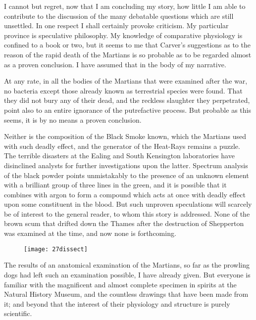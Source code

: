 

\lettrine[lines=4,findent=2pt]{I}{} cannot but regret, now that I am concluding my story, how little I am able to contribute to the discussion of the many debatable questions which are still unsettled. In one respect I shall certainly provoke criticism. My particular province is speculative philosophy. My knowledge of comparative physiology is confined to a book or two, but it seems to me that Carver's suggestions as to the reason of the rapid death of the Martians is so probable as to be regarded almost as a proven conclusion. I have assumed that in the body of my narrative.

At any rate, in all the bodies of the Martians that were examined after the war, no bacteria except those already known as terrestrial species were found. That they did not bury any of their dead, and the reckless slaughter they perpetrated, point also to an entire ignorance of the putrefactive process. But probable as this seems, it is by no means a proven conclusion.

Neither is the composition of the Black Smoke known, which the Martians used with such deadly effect, and the generator of the Heat-Rays remains a puzzle. The terrible disasters at the Ealing and South Kensington laboratories have disinclined analysts for further investigations upon the latter. Spectrum analysis of the black powder points unmistakably to the presence of an unknown element with a brilliant group of three lines in the green, and it is possible that it combines with argon to form a compound which acts at once with deadly effect upon some constituent in the blood. But such unproven speculations will scarcely be of interest to the general reader, to whom this story is addressed. None of the brown scum that drifted down the Thames after the destruction of Shepperton was examined at the time, and now none is forthcoming.


\begin{figure}[tb]
\centering
\texttt{[image: 27dissect]}
\end{figure}

The results of an anatomical examination of the Martians, so far as the prowling dogs had left such an examination possible, I have already given. But everyone is familiar with the magnificent and almost complete specimen in spirits at the Natural History Museum, and the countless drawings that have been made from it; and beyond that the interest of their physiology and structure is purely scientific.

